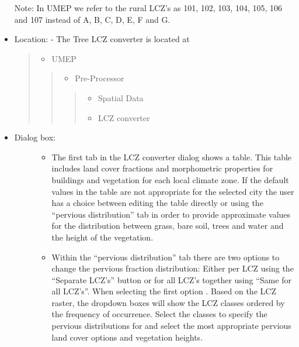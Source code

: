 \documentclass[letterpaper,10pt,english]{sphinxmanual}
\begin{document}
\begin{itemize}
Note: In UMEP we refer to the rural LCZ’s as 101, 102, 103, 104, 105, 106 and 107 instead of A, B, C, D, E, F and G.

\item {} 
Location:
- The Tree LCZ converter is located at
\begin{quote}
\begin{itemize}
\item {} 
UMEP

\end{itemize}
\begin{quote}
\begin{itemize}
\item {} 
Pre-Processor

\end{itemize}
\begin{quote}
\begin{itemize}
\item {} 
Spatial Data

\end{itemize}
\begin{itemize}
\item {} 
LCZ converter

\end{itemize}
\end{quote}
\end{quote}
\end{quote}

\item {} \begin{description}
\item[{Dialog box:}] \leavevmode\begin{itemize}
\item {} 
The first tab in the LCZ converter dialog shows a table. This table includes land cover fractions and morphometric properties for buildings and vegetation for each local climate zone. If the default values in the table are not appropriate for the selected city the user has a choice between editing the table directly or using the “pervious distribution” tab in order to provide approximate values for the distribution between grass, bare soil, trees and water and the height of the vegetation.

\item {} 
Within the “pervious distribution” tab there are two options to change the pervious fraction distribution: Either per LCZ using the “Separate LCZ’s” button or for all LCZ’s together using “Same for all LCZ’s”. When selecting the first option . Based on the LCZ raster, the dropdown boxes will show the LCZ classes ordered by the frequency of occurrence. Select the classes to specify the pervious distributions for and select the most appropriate pervious land cover options and vegetation heights.


\end{itemize}
\end{description}
\end{itemize}
\end{document}
